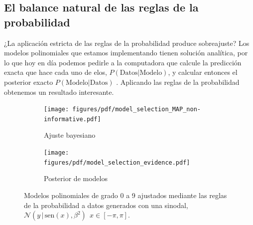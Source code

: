 \documentclass[a4paper,11pt]{book}
\newcommand{\N}{\mathcal{N}}
\theoremstyle{definition}
\begin{document}
%
%
%


\subsection{El balance natural de las reglas de la probabilidad}
¿La aplicación estricta de las reglas de la probabilidad produce sobreajuste?
%
Los modelos polinomiales que estamos implementando tienen solución analítica, por lo que hoy en día podemos pedirle a la computadora que calcule la predicción exacta que hace cada uno de elos, $P(\text{Datos}|\text{Modelo})$, y calcular entonces el posterior exacto $P(\text{Modelo}|\text{Datos})$ .
%
Aplicando las reglas de la probabilidad obtenemos un resultado interesante.
%
\begin{figure}[ht!] \centering
  \begin{subfigure}[t]{0.32\textwidth}
  \centering
  \texttt{[image: figures/pdf/model\_selection\_MAP\_non-informative.pdf]}
  \caption{Ajuste bayesiano}
  \label{fig:model_selection_MAP_non-informative}
  \end{subfigure}
  \begin{subfigure}[t]{0.32\textwidth}
  \centering
  \texttt{[image: figures/pdf/model\_selection\_evidence.pdf]}
  \caption{Posterior de modelos}
  \label{fig:model_selection_evidence}
  \end{subfigure}
  \caption{Modelos polinomiales de grado 0 a 9 ajustados mediante las reglas de la probabilidad a datos generados con una sinodal, $\N(y \,| \, \text{sen}(x), \beta^2) \ \ x \in [-\pi,\pi]$.}
  \label{fig:evaluacion_de_modelo}
\end{figure}
\end{document}
